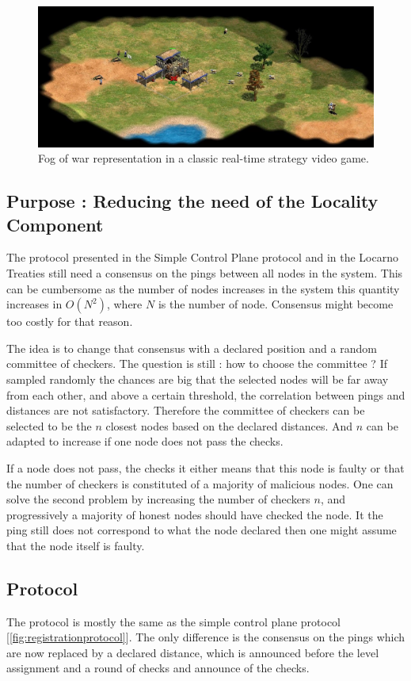 \documentclass[a4paper,11pt,oneside]{report}
\begin{document}
\begin{figure}[!h] 
\centering
\includegraphics[width=400pt]{figures/fog_of_war}
\caption{Fog of war representation in a classic real-time strategy video game. }
\label{fig:registrationprotocol}
\end{figure}

\subsection{Purpose : Reducing the need of the Locality Component}
The protocol presented in the Simple Control Plane protocol and in the Locarno
Treaties still need a consensus on the pings between all nodes in the system.
This can be cumbersome as the number of nodes increases in the system this
quantity increases in $O(N^2)$, where $N$ is the number of node. Consensus
might become too costly for that reason.

The idea is to change that consensus with a declared position and a random
committee of checkers. The question is still : how to choose the committee ? If
sampled randomly the chances are big that the selected nodes will be far away
from each other, and above a certain threshold, the correlation between pings
and distances are not satisfactory. Therefore the committee of checkers can be
selected to be the $n$ closest nodes based on the declared distances. And $n$
can be adapted to increase if one node does not pass the checks. 

If a node does not pass, the checks it either means that this node is faulty or
that the number of checkers is constituted of a majority of malicious nodes.
One can solve the second problem by increasing the number of checkers $n$, and
progressively a majority of honest nodes should have checked the node. It the
ping still does not correspond to what the node declared then one might assume
that the node itself is faulty. 

\subsection{Protocol}
The protocol is mostly the same as the simple control plane protocol
[\autoref{fig:registrationprotocol}]. The only difference is the consensus on
the pings which are now replaced by a declared distance, which is announced
before the level assignment and a round of checks and announce of the checks. 
\end{document}
